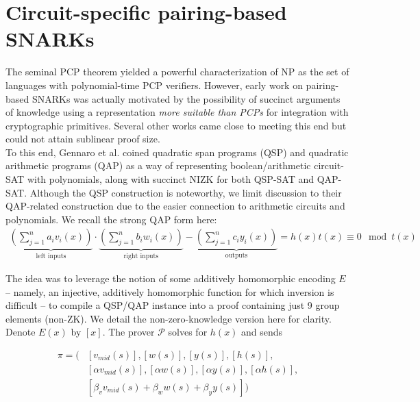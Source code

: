 \section{Circuit-specific pairing-based SNARKs}
\noindent The seminal PCP theorem yielded a powerful characterization of NP as the set of languages with polynomial-time PCP verifiers. However, early work on pairing-based SNARKs was actually motivated by the possibility of succinct arguments of knowledge using a representation \textit{more suitable than PCPs} for integration with cryptographic primitives. Several other works came close to meeting this end but could not attain sublinear proof size.\\

\noindent To this end, Gennaro et al. \cite{snarknopcp} coined quadratic span programs (QSP) and quadratic arithmetic programs (QAP) as a way of representing boolean/arithmetic circuit-SAT with polynomials, along with succinct NIZK for both QSP-SAT and QAP-SAT. Although the QSP construction is noteworthy, we limit discussion to their QAP-related construction due to the easier connection to arithmetic circuits and polynomials. We recall the strong QAP form here:
\begin{align}
\underbrace{\left(\sum_{j=1}^n a_i v_i(x)\right)}_{\text{left inputs}} \cdot \underbrace{\left(\sum_{j=1}^n b_i w_i(x)\right)}_{\text{right inputs}} - \underbrace{\left(\sum_{j=1}^n c_i y_i(x)\right)}_{\text{outputs}} = h(x) t(x) \equiv 0 \mod t(x)
\end{align}

\noindent The idea was to leverage the notion of some additively homomorphic encoding $E$ -- namely, an injective, additively homomorphic function for which inversion is difficult -- to compile a QSP/QAP instance into a proof containing just 9 group elements (non-ZK). We detail the non-zero-knowledge version here for clarity. Denote $E(x)$ by $[x]$. The prover $\mathcal{P}$ solves for $h(x)$ and sends

\begin{align}
    \pi = \Big(&[v_{mid}(s)], [w(s)], [y(s)], [h(s)], \\ 
    &[\alpha v_{mid}(s)], [\alpha w(s)], [\alpha y(s)], [\alpha h(s)], \\ 
    &[\beta_v v_{mid}(s) + \beta_w w(s) + \beta_y y(s)]\Big)
\end{align}

